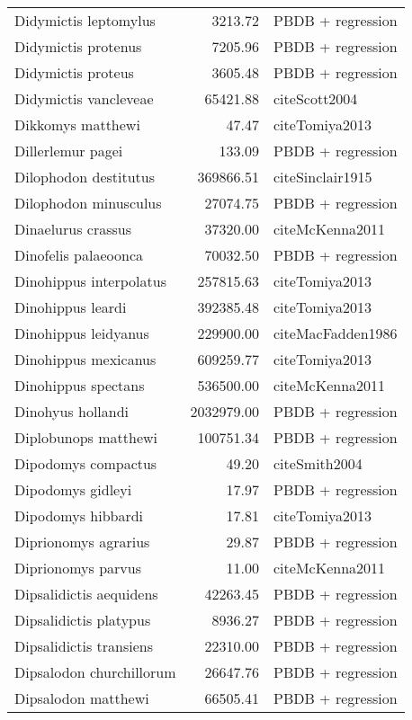 \begin{table}[ht]
\begin{tabular}{lrl}
  Didymictis leptomylus & 3213.72 & PBDB + regression \\ 
  Didymictis protenus & 7205.96 & PBDB + regression \\ 
  Didymictis proteus & 3605.48 & PBDB + regression \\ 
  Didymictis vancleveae & 65421.88 & cite{Scott2004} \\ 
  Dikkomys matthewi & 47.47 & cite{Tomiya2013} \\ 
  Dillerlemur pagei & 133.09 & PBDB + regression \\ 
  Dilophodon destitutus & 369866.51 & cite{Sinclair1915} \\ 
  Dilophodon minusculus & 27074.75 & PBDB + regression \\ 
  Dinaelurus crassus & 37320.00 & cite{McKenna2011} \\ 
  Dinofelis palaeoonca & 70032.50 & PBDB + regression \\ 
  Dinohippus interpolatus & 257815.63 & cite{Tomiya2013} \\ 
  Dinohippus leardi & 392385.48 & cite{Tomiya2013} \\ 
  Dinohippus leidyanus & 229900.00 & cite{MacFadden1986} \\ 
  Dinohippus mexicanus & 609259.77 & cite{Tomiya2013} \\ 
  Dinohippus spectans & 536500.00 & cite{McKenna2011} \\ 
  Dinohyus hollandi & 2032979.00 & PBDB + regression \\ 
  Diplobunops matthewi & 100751.34 & PBDB + regression \\ 
  Dipodomys compactus & 49.20 & cite{Smith2004} \\ 
  Dipodomys gidleyi & 17.97 & PBDB + regression \\ 
  Dipodomys hibbardi & 17.81 & cite{Tomiya2013} \\ 
  Diprionomys agrarius & 29.87 & PBDB + regression \\ 
  Diprionomys parvus & 11.00 & cite{McKenna2011} \\ 
  Dipsalidictis aequidens & 42263.45 & PBDB + regression \\ 
  Dipsalidictis platypus & 8936.27 & PBDB + regression \\ 
  Dipsalidictis transiens & 22310.00 & PBDB + regression \\ 
  Dipsalodon churchillorum & 26647.76 & PBDB + regression \\ 
  Dipsalodon matthewi & 66505.41 & PBDB + regression \\ 

\end{tabular}
\end{table}
